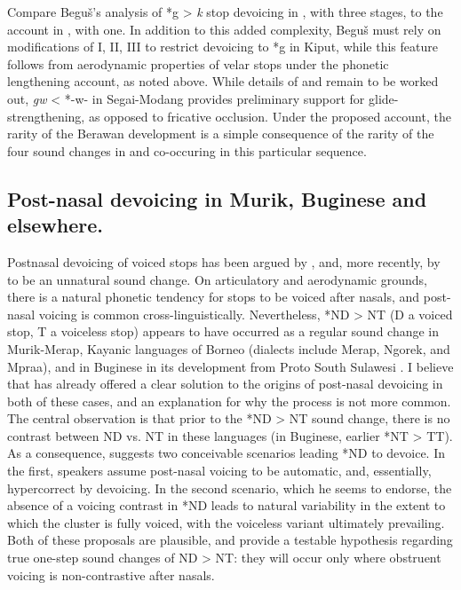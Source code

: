 \documentclass[output=paper]{langscibook}
\begin{document}
Compare Beguš’s analysis of *g > \textit{k} stop devoicing in , with three stages, to the account in , with one. In addition to this added complexity, Beguš must rely on modifications of I, II, III to restrict devoicing to *g in Kiput, while this feature follows from aerodynamic properties of velar stops under the phonetic lengthening account, as noted above. While details of  and  remain to be worked out, \textit{gw} < *-w- in Segai-Modang provides preliminary support for glide-strengthening, as opposed to fricative occlusion. Under the proposed account, the rarity of the Berawan development is a simple consequence of the rarity of the four sound changes in  and  co-occuring in this particular sequence.

\subsection{\label{sec:blevins:2.4}Post-nasal devoicing in Murik, Buginese and elsewhere.}
 Postnasal devoicing of voiced stops has been argued by \citet[258--262]{Blust2005}, and, more recently, by \citet{Beguš2018,Beguš2019} to be an unnatural sound change. On articulatory and aerodynamic grounds, there is a natural phonetic tendency for stops to be voiced after nasals, and post-nasal voicing is common cross\hyp linguistically. Nevertheless, *ND > NT (D a voiced stop, T a voiceless stop) appears to have occurred as a regular sound change in Murik-Merap, Kayanic languages of Borneo (dialects include Merap, Ngorek, and Mpraa), and in Buginese in its development from Proto South Sulawesi \citep{Mills1975}. I believe that \citet[258--262]{Blust2005} has already offered a clear solution to the origins of post-nasal devoicing in both of these cases, and an explanation for why the process is not more common. The central observation is that prior to the *ND > NT sound change, there is no contrast between ND vs. NT in these languages (in Buginese, earlier *NT > TT). As a consequence, \citet[261--262]{Blust2005} suggests two conceivable scenarios leading *ND to devoice. In the first, speakers assume post-nasal voicing to be automatic, and, essentially, hypercorrect by devoicing. In the second scenario, which he seems to endorse, the absence of a voicing contrast in *ND leads to natural variability in the extent to which the cluster is fully voiced, with the voiceless variant ultimately prevailing. Both of these proposals are plausible, and provide a testable hypothesis regarding true one-step sound changes of ND > NT: they will occur only where obstruent voicing is non-contrastive after nasals.
\end{document}
